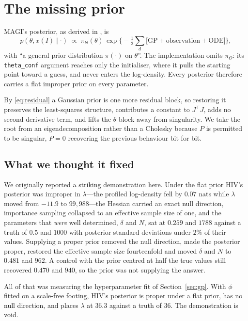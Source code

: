 \documentclass[11pt]{article}
\newcommand{\code}[1]{\texttt{\small #1}}
\theoremstyle{plain}
\theoremstyle{definition}
\theoremstyle{remark}
\begin{document}
\section{The missing prior}
\label{sec:prior}

MAGI's posterior, as derived in \cite{yang2021}, is
\[
  p(\theta, x(I)\mid\cdot) \;\propto\; \pi_\Theta(\theta)\,
  \exp\Big\{-\tfrac12\textstyle\sum_d\big[\text{GP} + \text{observation} + \text{ODE}\big]\Big\},
\]
with ``a general prior distribution $\pi(\cdot)$ on $\theta$''. The implementation omits
$\pi_\Theta$: its \code{theta\_conf} argument reaches only the initialiser, where it pulls the
starting point toward a guess, and never enters the log-density. Every posterior therefore carries
a flat improper prior on every parameter.

By \eqref{eq:residual} a Gaussian prior is one more residual block, so restoring it preserves the
least-squares structure, contributes a constant to $J^\top J$, adds no second-derivative term, and
lifts the $\theta$ block away from singularity. We take the root from an eigendecomposition rather
than a Cholesky because $P$ is permitted to be singular, $P=0$ recovering the previous behaviour
bit for bit.

\subsection{What we thought it fixed}

We originally reported a striking demonstration here. Under the flat prior HIV's posterior was
improper in $\lambda$---the profiled log-density fell by $0.07$ nats while $\lambda$ moved from
$-11.9$ to $99{,}988$---the Hessian carried an exact null direction, importance sampling collapsed
to an effective sample size of one, and the parameters that \emph{were} well determined, $\delta$
and $N$, sat at $0.259$ and $1788$ against a truth of $0.5$ and $1000$ with posterior standard
deviations under $2\%$ of their values. Supplying a proper prior removed the null direction, made
the posterior proper, restored the effective sample size fourteenfold and moved $\delta$ and $N$ to
$0.481$ and $962$. A control with the prior centred at half the true values still recovered $0.470$
and $940$, so the prior was not supplying the answer.

All of that was measuring the hyperparameter fit of Section~\ref{sec:gp}. With $\phi$ fitted on a
scale-free footing, HIV's posterior is proper under a flat prior, has no null direction, and places
$\lambda$ at $36.3$ against a truth of $36$. The demonstration is void.
\end{document}
